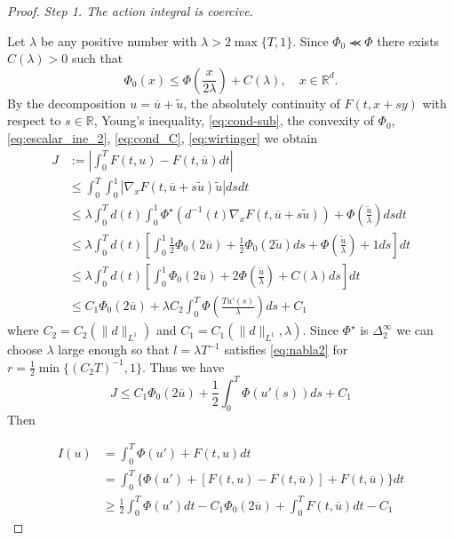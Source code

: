 \documentclass[twoside]{article}
\theoremstyle{remark}
\newcommand{\rr}{\mathbb{R}}
\renewcommand{\leq}{\leqslant}
\renewcommand{\geq}{\geqslant}
\begin{document}
\begin{proof} \emph{Step 1. The action integral is coercive}.
 
  
  Let $\lambda$ be any positive number with $\lambda>2\max\{T,1\}$. Since $\Phi_0\llcurly \Phi$ there exists $C(\lambda)>0$ such that 
  \begin{equation}\label{eq:cond_C}
    \Phi_0(x)\leq \Phi\left(\frac{x}{2\lambda}\right)+C(\lambda),\quad  x\in\rr^d. 
  \end{equation}
By the decomposition $u=\overline{u}+\tilde{u}$, the absolutely continuity of $F(t,x+sy)$ with respect to $s\in\rr$,  Young's inequality, \eqref{eq:cond-sub}, the convexity of $\Phi_0$, \eqref{eq:escalar_ine_2}, \eqref{eq:cond_C}, \eqref{eq:wirtinger}  we obtain
\begin{equation*}\label{eq:cota-dif-F}
\begin{split}
J&:=\left|\int_0^T F(t,u)-F(t,\overline{u})dt\right|
\\
&\leq \int_0^T \int_0^1 |\nabla_x F(t,\overline{u}+s\tilde{u})\tilde{u}|dsdt
\\
&\leq
\lambda \int_0^T d(t) \int_0^1 \Phi^{\star}\left(d^{-1}(t)\nabla_xF(t,\overline{u}+s\tilde{u})\right)+\Phi\left(\frac{\tilde{u}}{\lambda}\right)dsdt
\\
&\leq
\lambda\int_0^T d(t)\left[\int_0^1 \frac12\Phi_0(2\overline{u})+\frac12\Phi_0(2\tilde{u})ds+\Phi\left(\frac{\tilde{u}}{\lambda}\right)+1 ds\right]dt
\\
&\leq
\lambda\int_0^T d(t)\left[\int_0^1 \Phi_0(2\overline{u})+2\Phi\left(\frac{\tilde{u}}{\lambda}\right)+C(\lambda) ds\right]dt
\\
&\leq C_1 \Phi_0(2\overline{u})+\lambda C_2 \int_0^T \Phi\left(\frac{Tu'(s)}{\lambda}\right)ds+C_1
\end{split}
\end{equation*}
where $C_2=C_2(\|d\|_{L^1})$ and $C_1=C_1(\|d\|_{L^1},\lambda)$.  Since $\Phi^{\star}$ is $\Delta_2^{\infty}$ we can choose $\lambda$ large enough so that $l=\lambda T^{-1}$ satisfies  \eqref{eq:nabla2} for $r=\frac12 \min\{(C_2T)^{-1},1\}$. Thus we have
\[
 J\leq C_1 \Phi_0(2\overline{u})+\frac12 \int_0^T \Phi\left(u'(s)\right)ds+C_1
\]
Then

\begin{equation}
\begin{split}
I(u)&=\int_0^T  \Phi(u')+F(t,u)dt\\
&= \int_0^T \{\Phi(u')+[F(t,u)-F(t,\overline{u})]+F(t,\overline{u})\}dt
\\
&\geq
\frac12\int_0^T \Phi(u')dt-C_1\Phi_0(2 \overline{u})+\int_0^T F(t,\overline{u})dt-C_1
\end{split}
\end{equation}


\end{proof}
\end{document}
